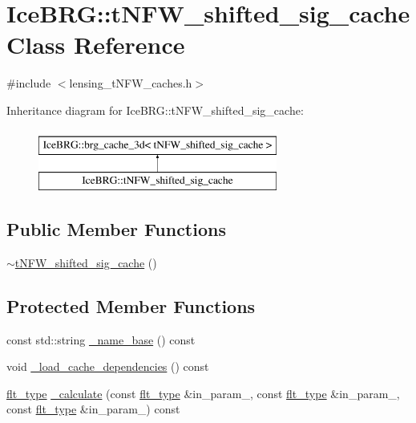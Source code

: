 \hypertarget{classIceBRG_1_1tNFW__shifted__sig__cache}{\section{Ice\-B\-R\-G\-:\-:t\-N\-F\-W\-\_\-shifted\-\_\-sig\-\_\-cache Class Reference}
\label{classIceBRG_1_1tNFW__shifted__sig__cache}
}


{\ttfamily \#include $<$lensing\-\_\-t\-N\-F\-W\-\_\-caches.\-h$>$}

Inheritance diagram for Ice\-B\-R\-G\-:\-:t\-N\-F\-W\-\_\-shifted\-\_\-sig\-\_\-cache\-:\begin{figure}[H]
\begin{center}
\leavevmode
\includegraphics[height=2.000000cm]{classIceBRG_1_1tNFW__shifted__sig__cache}
\end{center}
\end{figure}
\subsection*{Public Member Functions}
\begin{DoxyCompactItemize}
\item 
\hyperlink{classIceBRG_1_1tNFW__shifted__sig__cache_a3a3b0f919c72a584189e238d7046c254}{$\sim$t\-N\-F\-W\-\_\-shifted\-\_\-sig\-\_\-cache} ()
\end{DoxyCompactItemize}
\subsection*{Protected Member Functions}
\begin{DoxyCompactItemize}
\item 
const std\-::string \hyperlink{classIceBRG_1_1tNFW__shifted__sig__cache_aab456822c86bf60e53dda313daa2ca26}{\-\_\-name\-\_\-base} () const 
\item 
void \hyperlink{classIceBRG_1_1tNFW__shifted__sig__cache_a27ef9eeccf76f1e7c79766ac3ee458b6}{\-\_\-load\-\_\-cache\-\_\-dependencies} () const 
\item 
\hyperlink{lib_2IceBRG__main_2common_8h_ad0f130a56eeb944d9ef2692ee881ecc4}{flt\-\_\-type} \hyperlink{classIceBRG_1_1tNFW__shifted__sig__cache_abe308d79507fc34f91e9ef27a5533a31}{\-\_\-calculate} (const \hyperlink{lib_2IceBRG__main_2common_8h_ad0f130a56eeb944d9ef2692ee881ecc4}{flt\-\_\-type} \&in\-\_\-param\-\_, const \hyperlink{lib_2IceBRG__main_2common_8h_ad0f130a56eeb944d9ef2692ee881ecc4}{flt\-\_\-type} \&in\-\_\-param\-\_, const \hyperlink{lib_2IceBRG__main_2common_8h_ad0f130a56eeb944d9ef2692ee881ecc4}{flt\-\_\-type} \&in\-\_\-param\-\_) const 
\end{DoxyCompactItemize}
